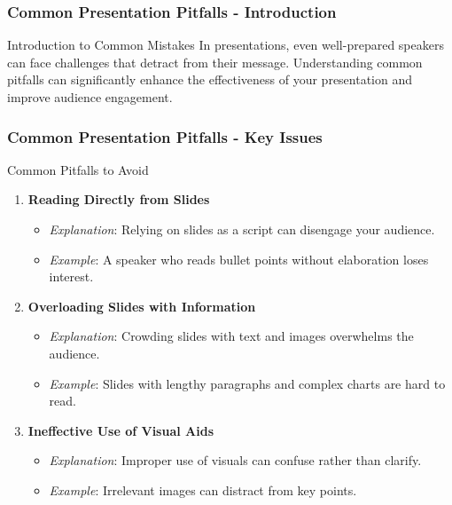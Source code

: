 \documentclass[aspectratio=169]{beamer}
\begin{document}
\begin{frame}[fragile]
    \frametitle{Common Presentation Pitfalls - Introduction}
    \begin{block}{Introduction to Common Mistakes}
        In presentations, even well-prepared speakers can face challenges that detract from their message. 
        Understanding common pitfalls can significantly enhance the effectiveness of your presentation 
        and improve audience engagement.
    \end{block}
\end{frame}

\begin{frame}[fragile]
    \frametitle{Common Presentation Pitfalls - Key Issues}
    \begin{block}{Common Pitfalls to Avoid}
        \begin{enumerate}
            \item \textbf{Reading Directly from Slides}
                \begin{itemize}
                    \item \textit{Explanation}: Relying on slides as a script can disengage your audience.
                    \item \textit{Example}: A speaker who reads bullet points without elaboration loses interest.
                \end{itemize}
            \item \textbf{Overloading Slides with Information}
                \begin{itemize}
                    \item \textit{Explanation}: Crowding slides with text and images overwhelms the audience.
                    \item \textit{Example}: Slides with lengthy paragraphs and complex charts are hard to read.
                \end{itemize}
            \item \textbf{Ineffective Use of Visual Aids}
                \begin{itemize}
                    \item \textit{Explanation}: Improper use of visuals can confuse rather than clarify.
                    \item \textit{Example}: Irrelevant images can distract from key points.
                \end{itemize}
        \end{enumerate}
    \end{block}
\end{frame}
\end{document}
